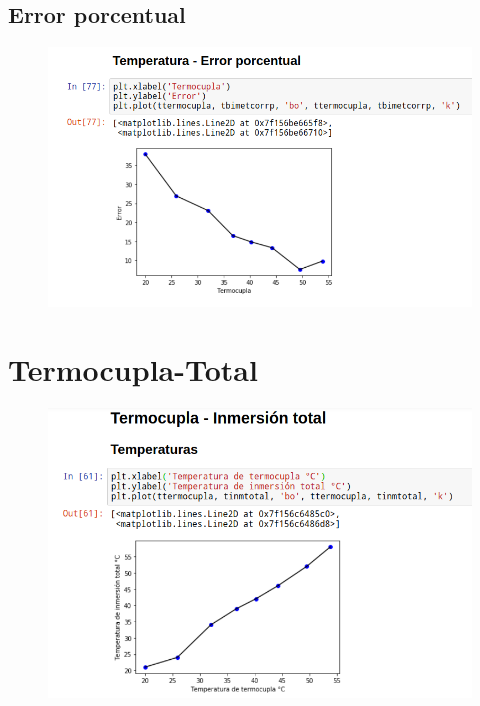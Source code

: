 \documentclass[a4paper,11pt]{report}
\begin{document}
\subsection{Error porcentual}
\begin{figure}[H]
\includegraphics[scale=0.55]{pbimet3.png}
\end{figure}
\section{Termocupla-Total}
\begin{figure}[H]
\includegraphics[scale=0.52]{ptotal1.png}
\end{figure}
\end{document}
